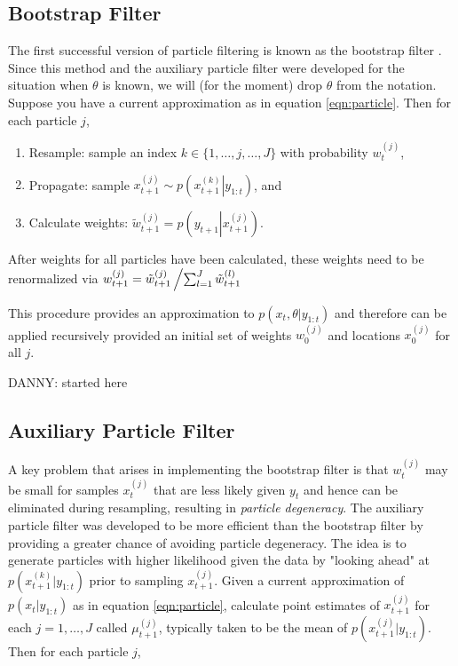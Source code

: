 \documentclass{article}
\newcommand{\danny}[1]{{\color{blue}DANNY: #1}}
\begin{document}
\subsection{Bootstrap Filter}

The first successful version of particle filtering is known as the bootstrap filter \citep{Gord:Salm:Smit:nove:1993}. Since this method and the auxiliary particle filter were developed for the situation when $\theta$ is known, we will (for the moment) drop $\theta$ from the notation. Suppose you have a current approximation as in equation \eqref{eqn:particle}. Then for each particle $j$,

\begin{enumerate}
\item Resample: sample an index $k\in \{1,\ldots,j,\ldots,J\}$ with probability $w_t^{(j)}$,
\item Propagate: sample $x_{t+1}^{(j)} \sim p\left(\left. x_{t+1}^{(k)}\right|y_{1:t}\right)$, and
\item Calculate weights: $\tilde{w}_{t+1}^{(j)} = p\left(y_{t+1}\left|x_{t+1}^{(j)}\right.\right)$.
\end{enumerate}

\noindent After weights for all particles have been calculated, these weights need to be renormalized via $w_{t+1}^{(j)} = \tilde{w}_{t+1}^{(j)}\left/ \sum_{l=1}^J \tilde{w}_{t+1}^{(l)} \right.$

This procedure provides an approximation to $p(x_t,\theta| y_{1:t})$ and therefore can be applied recursively provided an initial set of weights $w_0^{(j)}$ and locations $x_0^{(j)}$ for all $j$.

\danny{started here}

\subsection{Auxiliary Particle Filter}

A key problem that arises in implementing the bootstrap filter is that $w_t^{(j)}$ may be small for samples $x_t^{(j)}$ that are less likely given $y_t$ and hence can be eliminated during resampling, resulting in \emph{particle degeneracy}. The auxiliary particle filter \citep{Pitt:Shep:filt:1999} was developed to be more efficient than the bootstrap filter by providing a greater chance of avoiding particle degeneracy. The idea is to generate particles with higher likelihood given the data by "looking ahead" at $p(x_{t+1}^{(k)}|y_{1:t})$ prior to sampling $x_{t+1}^{(j)}$. Given a current approximation of $p(x_t|y_{1:t})$ as in equation \eqref{eqn:particle}, calculate point estimates of $x_{t+1}^{(j)}$ for each $j = 1,\ldots,J$ called $\mu_{t+1}^{(j)}$, typically taken to be the mean of $p(x_{t+1}^{(j)}|y_{1:t})$.  Then for each particle $j$,
\end{document}
